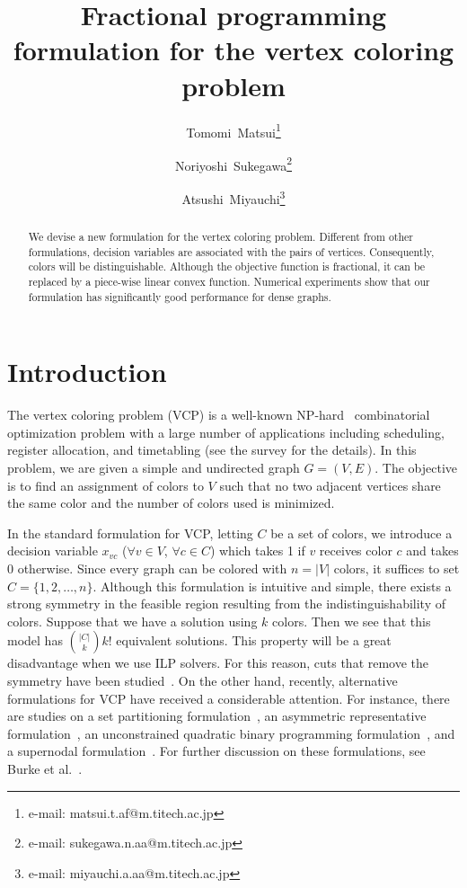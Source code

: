 \documentclass[11pt,a4paper]{article}
\title{Fractional programming formulation for the vertex coloring problem}
\date{\empty}
\author{Tomomi~Matsui\thanks{e-mail: matsui.t.af@m.titech.ac.jp}}
\author{Noriyoshi~Sukegawa\thanks{e-mail: sukegawa.n.aa@m.titech.ac.jp}}
\author{Atsushi~Miyauchi\thanks{e-mail: miyauchi.a.aa@m.titech.ac.jp}}
\affil{{\small \it{Graduate School of Decision Science and Technology, 
Tokyo Institute of Technology, Ookayama 2-12-1, Meguro-ku, Tokyo 152-8552, Japan}}}
\begin{document}
\maketitle
\vspace{-8mm}

\begin{abstract}
We devise a new formulation for the vertex coloring problem. 
Different from other formulations, 
decision variables are associated with the pairs of vertices. 
Consequently, colors will be distinguishable. 
Although the objective function is fractional, 
it can be replaced by a piece-wise linear convex function. 
Numerical experiments show that our formulation has significantly good performance for dense graphs. 
\end{abstract}

\section{Introduction} \label{sec:Intro}

The vertex coloring problem (VCP) is a well-known NP-hard~\cite{GaJo} combinatorial optimization problem 
with a large number of applications including scheduling, register allocation, and timetabling 
(see the survey \cite{MaTo} for the details). 
In this problem, 
we are given a simple and undirected graph $G=(V, E)$. 
The objective is to find an assignment of colors to $V$ such that 
no two adjacent vertices share the same color and 
the number of colors used is minimized. 

\par 

In the standard formulation for VCP, letting $C$ be a set of colors, 
we introduce a decision variable $x_{vc}$ ($\forall v \in V$, $\forall c \in C$) 
which takes 1 if $v$ receives color $c$ and takes 0 otherwise. 
Since every graph can be colored with $n=|V|$ colors, 
it suffices to set $C=\{1,2,\ldots, n\}$. 
Although this formulation is intuitive and simple, 
there exists a strong symmetry in the feasible region 
resulting from the indistinguishability of colors. 
Suppose that we have a solution using $k$ colors. 
Then we see that this model has $\binom{|C|}{k} k!$ equivalent solutions. 
This property will be a great disadvantage when we use ILP solvers. 
For this reason, cuts that remove the symmetry have been studied~\cite{MeZa, MeZa2}. 
On the other hand, recently, alternative formulations for VCP have received a considerable attention. 
For instance, there are studies on a set partitioning formulation~\cite{MeTr}, 
an asymmetric representative formulation~\cite{CaCaCo,CaCoFr}, 
an unconstrained quadratic binary programming formulation~\cite{KoGlAlRe}, and a supernodal formulation~\cite{Bu}. 
For further discussion on these formulations, see Burke et al.~\cite{Bu}. 
\end{document}
